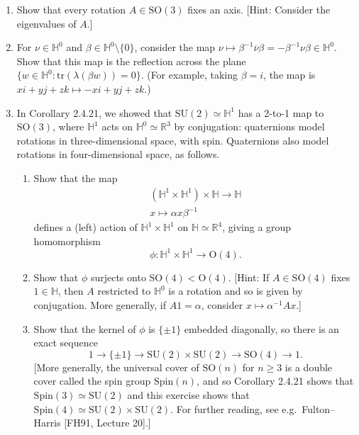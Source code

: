 \documentclass{article}
\theoremstyle{definition}
\begin{document}
\begin{enumerate}
\item Show that every rotation $A \in \mathrm{SO}(3)$ fixes an axis. [Hint: Consider the eigenvalues of $A$.]

\item For $\nu \in \mathbb{H}^0$ and $\beta \in \mathbb{H}^0 \setminus \{0\}$, consider the map $\nu \mapsto \beta^{-1} \overline{\nu} \beta = -\beta^{-1} \nu \beta \in \mathbb{H}^0$. Show that this map is the reflection across the plane $\{w \in \mathbb{H}^0 : \mathrm{tr}(\lambda(\beta w)) = 0\}$. (For example, taking $\beta = i$, the map is $xi + yj + zk \mapsto -xi + yj + zk$.)

\item In Corollary 2.4.21, we showed that $\mathrm{SU}(2) \simeq \mathbb{H}^1$ has a 2-to-1 map to $\mathrm{SO}(3)$, where $\mathbb{H}^1$ acts on $\mathbb{H}^0 \simeq \mathbb{R}^3$ by conjugation: quaternions model rotations in three-dimensional space, with spin. Quaternions also model rotations in four-dimensional space, as follows.
\begin{enumerate}[label=(\alph*)]
\item Show that the map
\begin{equation}
\begin{array}{c}
(\mathbb{H}^1 \times \mathbb{H}^1) \times \mathbb{H} \to \mathbb{H} \\
x \mapsto \alpha x \beta^{-1}
\end{array} \tag{2.4.26}
\end{equation}
defines a (left) action of $\mathbb{H}^1 \times \mathbb{H}^1$ on $\mathbb{H} \simeq \mathbb{R}^4$, giving a group homomorphism
$$\phi: \mathbb{H}^1 \times \mathbb{H}^1 \to \mathrm{O}(4).$$
\item Show that $\phi$ surjects onto $\mathrm{SO}(4) < \mathrm{O}(4)$. [Hint: If $A \in \mathrm{SO}(4)$ fixes $1 \in \mathbb{H}$, then $A$ restricted to $\mathbb{H}^0$ is a rotation and so is given by conjugation. More generally, if $A1 = \alpha$, consider $x \mapsto \alpha^{-1}Ax$.]
\item Show that the kernel of $\phi$ is $\{\pm 1\}$ embedded diagonally, so there is an exact sequence
$$1 \to \{\pm 1\} \to \mathrm{SU}(2) \times \mathrm{SU}(2) \to \mathrm{SO}(4) \to 1.$$
[More generally, the universal cover of $\mathrm{SO}(n)$ for $n \geq 3$ is a double cover called the spin group $\mathrm{Spin}(n)$, and so Corollary 2.4.21 shows that $\mathrm{Spin}(3) \simeq \mathrm{SU}(2)$ and this exercise shows that $\mathrm{Spin}(4) \simeq \mathrm{SU}(2) \times \mathrm{SU}(2)$. For further reading, see e.g.\ Fulton--Harris [FH91, Lecture 20].]
\end{enumerate}


\end{enumerate}
\end{document}
